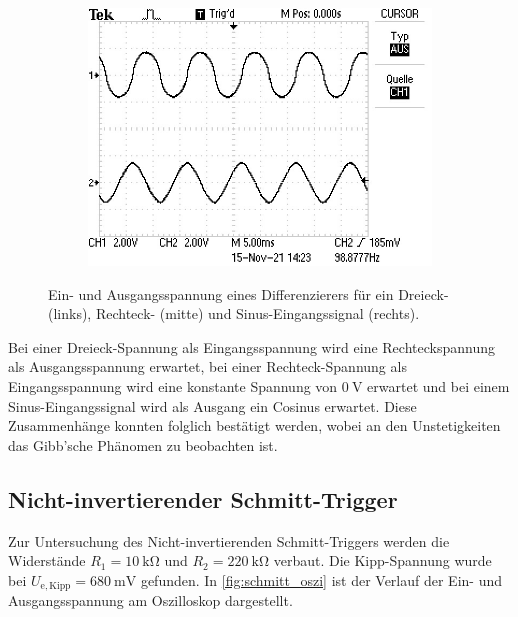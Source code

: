 \begin{figure}[H]
\begin{subfigure}{.4\textwidth}
    \includegraphics[width=\linewidth]{data/ALL0064/F0064TEK.JPG}
  \end{subfigure}
  \caption{Ein- und Ausgangsspannung eines Differenzierers für ein Dreieck- (links), Rechteck- (mitte) und Sinus-Eingangssignal (rechts).}
  \label{fig:diff_oszi}
\end{figure}

Bei einer Dreieck-Spannung als Eingangsspannung wird eine Rechteckspannung als Ausgangsspannung erwartet, bei einer Rechteck-Spannung als Eingangsspannung wird eine konstante Spannung von $\SI{0}{\volt}$ erwartet und bei einem Sinus-Eingangssignal wird als Ausgang ein Cosinus erwartet. Diese Zusammenhänge konnten folglich bestätigt werden, wobei an den Unstetigkeiten das Gibb'sche Phänomen zu beobachten ist.

\subsection{Nicht-invertierender Schmitt-Trigger}

Zur Untersuchung des Nicht-invertierenden Schmitt-Triggers werden die Widerstände $R_1 = \SI{10}{\kilo\ohm}$ und $R_2 = \SI{220}{\kilo\ohm}$ verbaut. Die Kipp-Spannung wurde bei $U_{\mathrm{e, Kipp}} = \SI{680}{\milli\volt}$ gefunden. In \autoref{fig:schmitt_oszi} ist der Verlauf der Ein- und Ausgangsspannung am Oszilloskop dargestellt.

